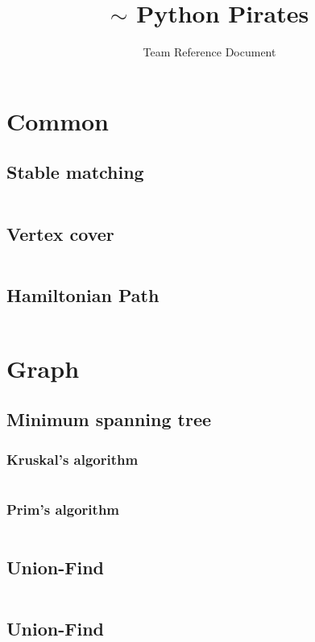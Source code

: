 \documentclass[8pt,a4paper,landscape,oneside]{amsart}
\title{$\sim$ Python Pirates}
\subtitle{Team Reference Document}
\date{\ddmmyyyydate{\today{}}}
\newcommand{\code}[1]{\inputminted[fontsize=\normalsize,baselinestretch=1]{python}{code/#1}}
\begin{document}
\begin{multicols*}{3}
\maketitle
\thispagestyle{fancy}
\vspace{-3em}
\tableofcontents


\section{Common}

    \subsection{Stable matching}
        \code{helloworld.py}
    \subsection{Vertex cover}
        \code{helloworld.py}
    \subsection{Hamiltonian Path}
        \code{helloworld.py}

\section{Graph}

    \subsection{Minimum spanning tree}
        \subsubsection{Kruskal's algorithm}
            \code{helloworld.py}
        \subsubsection{Prim's algorithm}
            \code{helloworld.py}
    \subsection{Union-Find}
        \code{helloworld.py}
    \subsection{Union-Find}
        \code{helloworld.py}

\end{multicols*}
\end{document}
